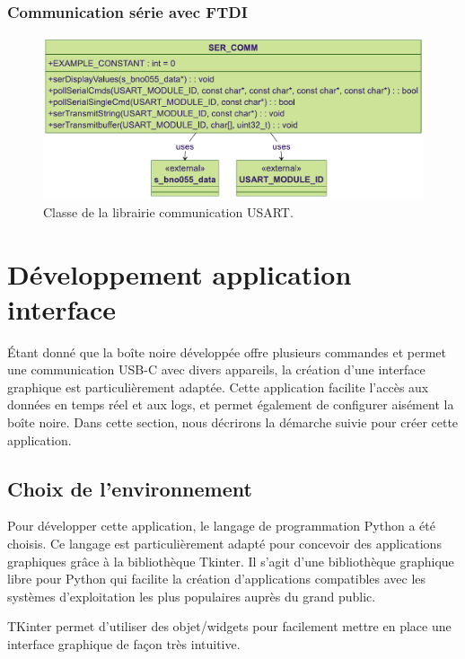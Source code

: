 \subsubsection{Communication série avec FTDI}

\begin{figure}[H]
	\centering
	\includegraphics[width=1\linewidth]{../figures/code/diagrammes/ser-com-class}
	\caption{Classe de la librairie communication USART.}
	\label{fig:ser-com-class}
\end{figure}

\clearpage

\section{Développement application interface} \label{sec:devApp}

Étant donné que la boîte noire développée offre plusieurs commandes et permet une communication USB-C avec divers appareils, la création d'une interface graphique est particulièrement adaptée. Cette application facilite l'accès aux données en temps réel et aux logs, et permet également de configurer aisément la boîte noire. Dans cette section, nous décrirons la démarche suivie pour créer cette application.

\subsection{Choix de l'environnement}

Pour développer cette application, le langage de programmation Python a été choisis. Ce langage est particulièrement adapté pour concevoir des applications graphiques grâce à la bibliothèque Tkinter. Il s'agit d'une bibliothèque graphique libre pour Python qui facilite la création d'applications compatibles avec les systèmes d'exploitation les plus populaires auprès du grand public.

TKinter permet d’utiliser des objet/widgets pour facilement mettre en place une interface graphique de façon très intuitive.

